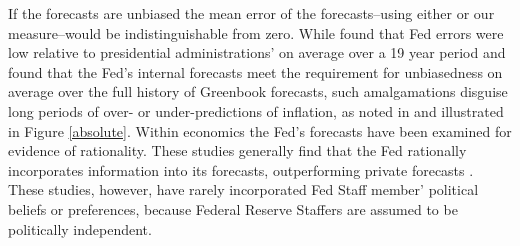 \documentclass[a4paper]{article}
\begin{document}
If the forecasts are unbiased the mean error of the forecasts--using either \cite{Frendreis2000} or our measure--would be indistinguishable from zero. While \cite{Frendreis2000} found that Fed errors were low relative to presidential administrations' on average over a 19 year period and \cite{Romer2000} found that the Fed's internal forecasts meet the requirement for unbiasedness on average over the full history of Greenbook forecasts, such amalgamations disguise long periods of over- or under-predictions of inflation, as noted in \cite{Capistran2006} and illustrated in Figure \ref{absolute}. Within economics the Fed's forecasts have been examined for evidence of rationality. These studies generally find that the Fed rationally incorporates information into its forecasts, outperforming private forecasts \cite[c.f.][]{Gamber2009}. These studies, however, have rarely incorporated Fed Staff member' political beliefs or preferences, because Federal Reserve Staffers are assumed to be politically independent.
\end{document}

